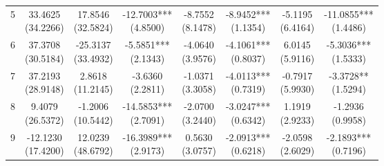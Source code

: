 \begin{table}[!htbp]
\begin{threeparttable}
\begin{subtable}[t]{\textwidth}
\begin{tabular}{@{}lccccccc@{}}
5 & \shortstack{33.4625\\(34.2266)} & \shortstack{17.8546\\(32.5824)} & \shortstack{-12.7003***\\(4.8500)} & \shortstack{-8.7552\\(8.1478)} & \shortstack{-8.9452***\\(1.1354)} & \shortstack{-5.1195\\(6.4164)} & \shortstack{-11.0855***\\(1.4486)} \\
6 & \shortstack{37.3708\\(30.5184)} & \shortstack{-25.3137\\(33.4932)} & \shortstack{-5.5851***\\(2.1343)} & \shortstack{-4.0640\\(3.9576)} & \shortstack{-4.1061***\\(0.8037)} & \shortstack{6.0145\\(5.9116)} & \shortstack{-5.3036***\\(1.5333)} \\
7 & \shortstack{37.2193\\(28.9148)} & \shortstack{2.8618\\(11.2145)} & \shortstack{-3.6360\\(2.2811)} & \shortstack{-1.0371\\(3.3058)} & \shortstack{-4.0113***\\(0.7319)} & \shortstack{-0.7917\\(5.9930)} & \shortstack{-3.3728**\\(1.5294)} \\
8 & \shortstack{9.4079\\(26.5372)} & \shortstack{-1.2006\\(10.5442)} & \shortstack{-14.5853***\\(2.7091)} & \shortstack{-2.0700\\(3.2440)} & \shortstack{-3.0247***\\(0.6342)} & \shortstack{1.1919\\(2.9233)} & \shortstack{-1.2936\\(0.9958)} \\
9 & \shortstack{-12.1230\\(17.4200)} & \shortstack{12.0239\\(48.6792)} & \shortstack{-16.3989***\\(2.9173)} & \shortstack{0.5630\\(3.0757)} & \shortstack{-2.0913***\\(0.6218)} & \shortstack{-2.0598\\(2.6029)} & \shortstack{-2.1893***\\(0.7196)} \\

\end{tabular}
\end{subtable}
\end{threeparttable}
\end{table}
